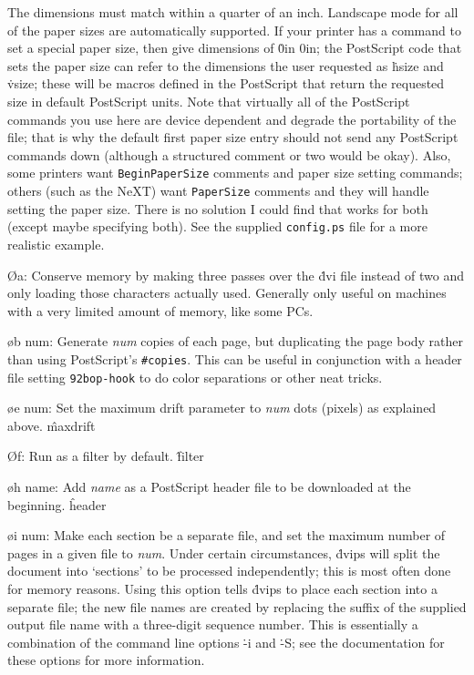 {The dimensions must match
within a quarter of an inch.  Landscape mode for all of the paper sizes
are automatically supported.  If your printer has a command to set a
special paper size, then give dimensions of \.{0in 0in}; the PostScript
code that sets the paper size can refer to the dimensions the user
requested as \.{\ttbackslash hsize} and \.{\ttbackslash vsize};
these will be macros defined in
the PostScript that return the requested size in default PostScript
units.  Note that virtually all of the PostScript commands you use
here are device dependent and degrade the portability of the file; that
is why the default first paper size entry should not send any PostScript
commands down (although a structured comment or two would be okay).
Also, some printers want {\tt BeginPaperSize} comments and paper size
setting commands; others (such as the NeXT) want {\tt PaperSize} comments
and they will handle setting the paper size.  There is no solution I
could find that works for both (except maybe specifying both).
See the supplied {\tt config.ps} file for a more realistic
example.

\O a:  Conserve memory by making three passes over the \.{dvi} file
instead of two and only loading those characters actually used.
Generally only useful on machines with a very limited amount of
memory, like some PCs.

\o b num: Generate {\it num} copies of each page, but duplicating the
page body rather than using PostScript's {\tt\#copies}.  This can be
useful in conjunction with a header file setting {\tt\char92bop-hook}
to do color separations or other neat tricks.

\o e num:
Set the maximum drift parameter to {\it num} dots (pixels) as explained above.
\^{maxdrift}

\O f:  Run as a filter by default.
\^{filter}

\o h name:
Add {\it name} as a PostScript header file to be downloaded at the beginning.
\^{header}

\o i num:
Make each section be a separate file, and set the maximum number of pages
in a given file to {\it num}.  Under certain circumstances,
\.{dvips} will split the document into `sections' to be processed
independently; this is most often done for memory reasons.  Using this
option tells \.{dvips} to place each section into a separate file; the
new file names are created by replacing the suffix of the supplied output
file name with a three-digit sequence number.
This is essentially a combination of the
command line options \.{-i} and \.{-S}; see the documentation for these
options for more information.

}
